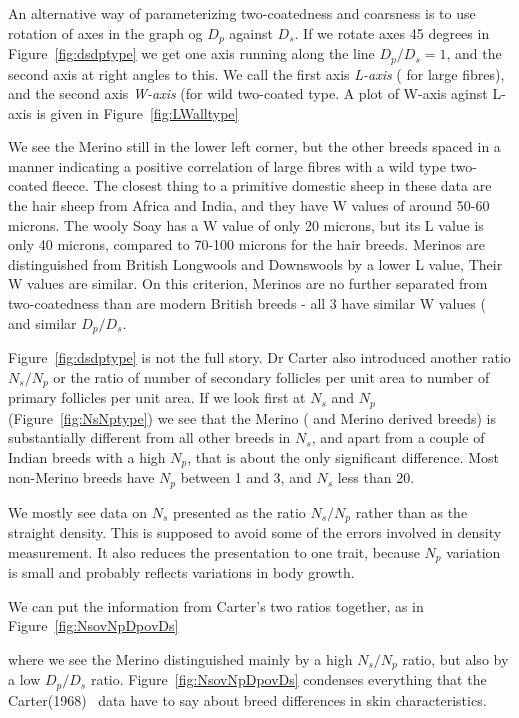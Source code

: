 \documentclass[titlepage]{article}  %
\begin{document}
An alternative way of parameterizing two-coatedness and coarsness is to use rotation of axes in the graph og $D_{p}$ against $D_{s}$. If we rotate axes 45 degrees in Figure~\ref{fig:dsdptype} we get one axis running along the line $D_{p}/D_{s} = 1$, and the second axis at right angles to this. We call the first axis {\em L-axis} ( for large fibres), and the second axis {\em W-axis} (for wild two-coated type. A plot of W-axis aginst L-axis is given in Figure~\ref{fig:LWalltype}

We see the Merino still in the lower left corner, but the other breeds spaced in a manner indicating  a positive correlation of large fibres with a wild type two-coated fleece. The closest thing to a primitive domestic sheep in these data are the hair sheep from Africa and India, and they have W values of around 50-60 microns. The wooly Soay has a W value of only 20 microns, but its L value is only 40 microns, compared to 70-100 microns for the hair breeds. Merinos are distinguished from British Longwools and Downswools by a lower L value, Their W values are similar. On this criterion, Merinos are no further separated from two-coatedness than are modern British breeds - all 3 have similar W values ( and similar $D_{p}/D_{s}$.

Figure~\ref{fig:dsdptype} is not the full story. Dr Carter also introduced another ratio $N_{s}/N_{p}$  or the ratio of number of secondary follicles per unit area to number of primary follicles per unit area. If we look first at $N_{s}$ and $N_{p}$ (Figure~\ref{fig:NsNptype}) we see that the Merino ( and Merino derived breeds) is substantially different from all other breeds in $N_{s}$, and apart from a couple of Indian breeds with a high $N_{p}$, that is about the only significant difference. Most non-Merino breeds have $N_{p}$ between 1 and 3, and $N_{s}$ less than 20.

We mostly see data on $N_{s}$ presented as the ratio $N_{s}/N_{p}$ rather than as the straight density. This is supposed to avoid some of the errors involved in density measurement. It also reduces the presentation to one trait, because $N_{p}$ variation is small and probably reflects  variations in body growth. 

We can put the information from Carter's two ratios together, as in Figure~\ref{fig:NsovNpDpovDs}

where we see the Merino distinguished mainly by a high $N_{s}/N_{p}$ ratio, but also by a low $D_{p}/D_{s}$ ratio. Figure~\ref{fig:NsovNpDpovDs} condenses everything that the Carter(1968)~\cite{cart:68} data have to say about breed differences in skin characteristics.
\end{document}
